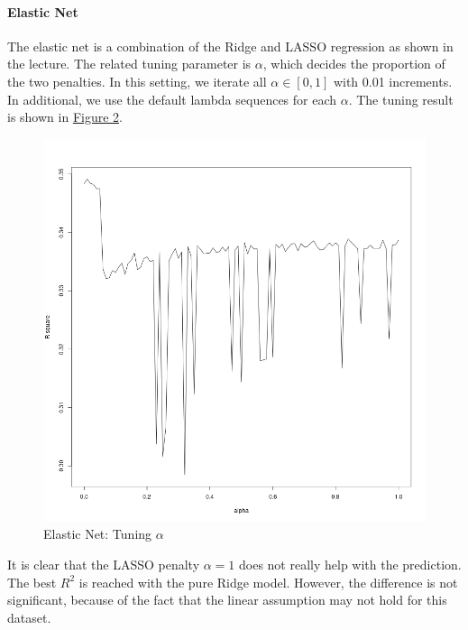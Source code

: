 \documentclass[8pt]{article}
\begin{document}
\paragraph{Elastic Net}
The elastic net is a combination of the Ridge and LASSO regression as shown in the lecture. 
The related tuning parameter is $\alpha$, which decides the proportion of the two penalties. 
In this setting, we iterate all $\alpha \in [0, 1]$ with 0.01 increments. 
In additional, we use the default lambda sequences for each $\alpha$. 
The tuning result is shown in \hyperref[fig:elastic_net]{Figure 2}.
\begin{figure}[H]
    \centering
    \includegraphics*[scale=0.25]{figures/elastic_net.png}
    \caption{Elastic Net: Tuning $\alpha$}
    \label{fig:elastic_net}
\end{figure}
It is clear that the LASSO penalty $\alpha = 1$ does not really help with the prediction.
The best $R^2$ is reached with the pure Ridge model. However, the difference is not significant, 
because of the fact that the linear assumption may not hold for this dataset.
\end{document}
